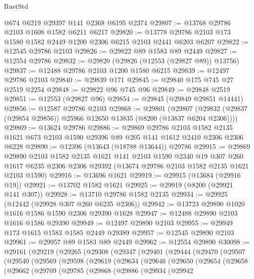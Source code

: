 \begin{lexlean}{RustStd}
\begin{coremodule}
    @674
    @6219
    @29397
    @141
    @2368
    @6195
    @2374
@29807 := @13768 @29786 @2103 @1608 @1582 @6211 @6217
@29820 := @13778 @29786 @2103 @173 @1580 @1582 @2449 @1200 @2306 @6215 @2103 @2441 @6203 @6207
@29822 := @12545 @29786 @2103
@29826 := @29822 @89 @1583 @89 @2449
@29827 := @12554 @29786
@29832 := @29820 (@29826 (@12553 (@29827 @89)) @13756)
@29837 := @12488 @29786 @2103 @1200 @1580 @6215
@29839 := @12497 @29786 @2103
@29840 := @29839 @171
@29845 := @29840 @175 @745 @27 @2519 @2254
@29848 := @29822 @96 @745 @96
@29849 := @29848 @2519
@29851 := @12553 (@29827 @96)
@29854 := @29845 (@29849 @29851 @14441)
@29856 := @12587 @29786 @2103
@29868 := @29801
    (@29807 (@29832 (@29837 (@29854 @29856)) @25966 @12650 @13835 (@8200 (@13837 @6204 @2306))))
@29869 := @13624 @29786
@29886 := @29869
    @29786
    @2103
    @1582
    @2135
    @1621
    @673
    @2103
    @1590
    @29396
    @89
    @205
    @141
    @1612
    @2410
    @2306
    @2306
    @6228
@29890 := @12396 (@13643 (@18788 @13644)) @29786
@29915 := @29869
    @29890
    @2103
    @1582
    @2135
    @1621
    @141
    @2103
    @1590
    @2340
    @19
    @307
    @260
    @1617
    @6235
    @2306
    @2306
    @29392
    (@13674 @29786 @2103 @1582 @2135 @1621 @2103 @1590)
@29916 := @13696 @1621
@29919 := @29915 (@13684 (@29916 @19))
@29921 := @13702 @1582 @1621
@29925 := @29919 (@8200 (@29921 @141 @307))
@29928 := @13710 @29786 @1582 @2135
@29934 := @29925 (@12442 (@29928 @307 @260 @6235 @2306))
@29942 := @13723 @29890 @1020 @1616 @1586 @1590 @2306 @29390 @1628
@29947 := @12488 @29890 @2103 @1616 @1586 @29390
@29949 := @12497 @29890 @2103
@29955 := @29949 @173 @1615 @1583 @1585 @2449 @29389
@29957 := @12545 @29890 @2103
@29961 := @29957 @89 @1583 @89 @2449
@29962 := @12554 @29890
@30098 := @29161
    (@29219
      (@29265
        (@29308
          (@29347
            (@29401
              (@29444
                (@29470
                  (@29507
                    (@29540
                      (@29569
                        (@29598
                          (@29619
                            (@29634
                              (@29646
                                (@29650
                                  (@29654
                                    (@29658
                                      (@29662
                                        (@29709
                                          (@29785
                                            (@29868
                                              (@29886
                                                (@29934
                                                  (@29942

\end{coremodule}
\end{lexlean}
